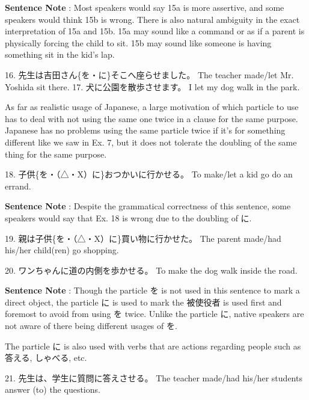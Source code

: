 \par{\textbf{Sentence Note }: Most speakers would say 15a is more assertive, and some speakers would think 15b is wrong. There is also natural ambiguity in the exact interpretation of 15a and 15b. 15a may sound like a command or as if a parent is physically forcing the child to sit. 15b may sound like someone is having something sit in the kid's lap. }

\par{16. 先生は吉田さん\{を・に\}そこへ座らせました。 \hfill\break
The teacher made\slash let Mr. Yoshida sit there. }
17. 犬に公園を散歩させます。 \hfill\break
I let my dog walk in the park. 
\par{ As far as realistic usage of Japanese, a large motivation of which particle to use has to deal with not using the same one twice in a clause for the same purpose. Japanese has no problems using the same particle twice if it's for something different like we saw in Ex. 7, but it does not tolerate the doubling of the same thing for the same purpose. }

\par{18. 子供\{を・（△・X）に\}おつかいに行かせる。 \hfill\break
To make\slash let a kid go do an errand. }

\par{\textbf{Sentence Note }: Despite the grammatical correctness of this sentence, some speakers would say that Ex. 18 is wrong due to the doubling of に. }

\par{19. 親は子供\{を・（△・X）に\}買い物に行かせた。 \hfill\break
The parent made\slash had his\slash her child(ren) go shopping. }

\par{20. ワンちゃんに道の内側を歩かせる。 \hfill\break
To make the dog walk inside the road. }

\par{\textbf{Sentence Note }: Though the particle を is not used in this sentence to mark a direct object, the particle に is used to mark the 被使役者 is used first and foremost to avoid from using を twice. Unlike the particle に, native speakers are not aware of there being different usages of を. }

\par{ The particle に is also used with verbs that are actions regarding people such as 答える, しゃべる, etc. }

\par{21. 先生は、学生に質問に答えさせる。 \hfill\break
The teacher made\slash had his\slash her students answer (to) the questions. }


